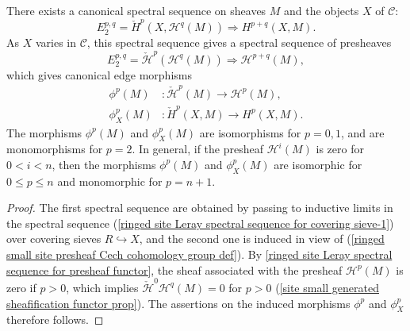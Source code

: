 \begin{corollary}\label{ringed site Cech to derive spectral sequence}
There exists a canonical spectral sequence on sheaves $M$ and the objects $X$ of $\mathcal{C}$:
\begin{equation}\label{ringed site Cech to derive spectral sequence-1}
E_2^{p,q}=\check{H}^p(X,\mathcal{H}^q(M))\Rightarrow H^{p+q}(X,M).
\end{equation}
As $X$ varies in $\mathcal{C}$, this spectral sequence gives a spectral sequence of presheaves
\begin{equation}\label{ringed site Cech to derive spectral sequence-2}
E_2^{p,q}=\check{\mathcal{H}}^p(\mathcal{H}^q(M))\Rightarrow \mathcal{H}^{p+q}(M),
\end{equation}
which gives canonical edge morphisms
\begin{align}
\phi^p(M)&:\check{\mathcal{H}}^p(M)\to \mathcal{H}^p(M),\label{ringed site Cech to derive spectral sequence-3}\\
\phi^p_X(M)&:\check{H}^p(X,M)\to H^p(X,M).\label{ringed site Cech to derive spectral sequence-4}
\end{align}
The morphisms $\phi^p(M)$ and $\phi_X^p(M)$ are isomorphisms for $p=0,1$, and are monomorphisms for $p=2$. In general, if the presheaf $\mathcal{H}^i(M)$ is zero for $0<i<n$, then the morphisms $\phi^p(M)$ and $\phi^p_X(M)$ are isomorphic for $0\leq p\leq n$ and monomorphic for $p=n+1$.
\end{corollary}
\begin{proof}
The first spectral sequence are obtained by passing to inductive limits in the spectral sequence (\ref{ringed site Leray spectral sequence for covering sieve-1}) over covering sieves $R\hookrightarrow X$, and the second one is induced in view of (\ref{ringed small site presheaf Cech cohomology group def}). By \cref{ringed site Leray spectral sequence for presheaf functor}, the sheaf associated with the presheaf $\mathcal{H}^p(M)$ is zero if $p>0$, which implies $\check{\mathcal{H}}^0\mathcal{H}^q(M)=0$ for $p>0$ (\cref{site small generated sheafification functor prop}). The assertions on the induced morphisms $\phi^p$ and $\phi^p_X$ therefore follows.
\end{proof}

